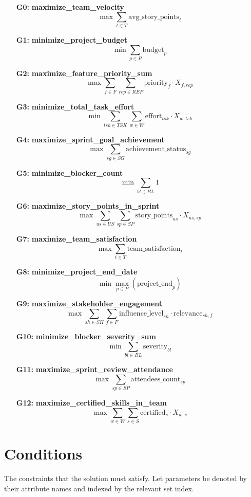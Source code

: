 \documentclass[11pt, a4paper]{article}
\begin{document}
\begin{itemize}
    \item[\textbf{G0:}] \textbf{maximize\_team\_velocity}
    $$ \max \sum_{t \in T} \text{avg\_story\_points}_{t} $$
    \item[\textbf{G1:}] \textbf{minimize\_project\_budget}
    $$ \min \sum_{p \in P} \text{budget}_{p} $$
    \item[\textbf{G2:}] \textbf{maximize\_feature\_priority\_sum}
    $$ \max \sum_{f \in F} \sum_{rep \in REP} \text{priority}_{f} \cdot X_{f,rep} $$
    \item[\textbf{G3:}] \textbf{minimize\_total\_task\_effort}
    $$ \min \sum_{tsk \in TSK} \sum_{w \in W} \text{effort}_{tsk} \cdot X_{w,tsk} $$
    \item[\textbf{G4:}] \textbf{maximize\_sprint\_goal\_achievement}
    $$ \max \sum_{sg \in SG} \text{achievement\_status}_{sg} $$
    \item[\textbf{G5:}] \textbf{minimize\_blocker\_count}
    $$ \min \sum_{bl \in BL} 1 $$
    \item[\textbf{G6:}] \textbf{maximize\_story\_points\_in\_sprint}
    $$ \max \sum_{us \in US} \sum_{sp \in SP} \text{story\_points}_{us} \cdot X_{us,sp} $$
    \item[\textbf{G7:}] \textbf{maximize\_team\_satisfaction}
    $$ \max \sum_{t \in T} \text{team\_satisfaction}_{t} $$
    \item[\textbf{G8:}] \textbf{minimize\_project\_end\_date}
    $$ \min \max_{p \in P} (\text{project\_end}_{p}) $$
    \item[\textbf{G9:}] \textbf{maximize\_stakeholder\_engagement}
    $$ \max \sum_{sh \in SH} \sum_{f \in F} \text{influence\_level}_{sh} \cdot \text{relevance}_{sh,f} $$
    \item[\textbf{G10:}] \textbf{minimize\_blocker\_severity\_sum}
    $$ \min \sum_{bl \in BL} \text{severity}_{bl} $$
    \item[\textbf{G11:}] \textbf{maximize\_sprint\_review\_attendance}
    $$ \max \sum_{sp \in SP} \text{attendees\_count}_{sp} $$
    \item[\textbf{G12:}] \textbf{maximize\_certified\_skills\_in\_team}
    $$ \max \sum_{w \in W} \sum_{s \in S} \text{certified}_{s} \cdot X_{w,s} $$
\end{itemize}

\section{Conditions}
The constraints that the solution must satisfy. Let parameters be denoted by their attribute names and indexed by the relevant set index.
\end{document}
